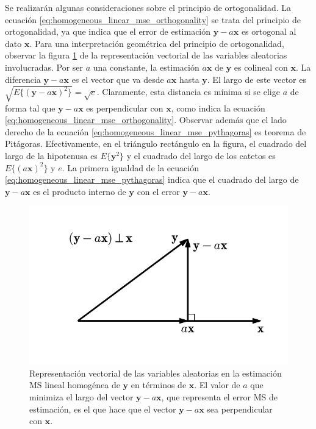 \documentclass[a4paper]{report}
\newcommand{\x}{\mathbf{x}}
\newcommand{\y}{\mathbf{y}}
\begin{document}
Se realizarán algunas consideraciones sobre el principio de ortogonalidad. La ecuación \ref{eq:homogeneous_linear_mse_orthogonality} se trata del principio de ortogonalidad, ya que indica que el error de estimación \(\y-a\x\) es ortogonal al dato \(\x\). Para una interpretación geométrica del principio de ortogonalidad, observar la figura \ref{fig:mse_linear_homogeneous} de la representación vectorial de las variables aleatorias involucradas. Por ser \(a\) una constante, la estimación \(a\x\) de \(\y\) es colineal con \(\x\). La diferencia \(\y-a\x\) es el vector que va desde \(a\x\) hasta \(\y\). El largo de este vector es \(\sqrt{E\{(\y-a\x)^2\}}=\sqrt{e}\). Claramente, esta distancia es mínima si se elige \(a\) de forma tal que \(\y-a\x\) es perpendicular con \(\x\), como indica la ecuación \ref{eq:homogeneous_linear_mse_orthogonality}. Observar además que el lado derecho de la ecuación \ref{eq:homogeneous_linear_mse_pythagoras} es teorema de Pitágoras. Efectivamente, en el triángulo rectángulo en la figura, el cuadrado del largo de la hipotenusa es \(E\{\y^2\}\) y el cuadrado del largo de los catetos es \(E\{(a\x)^2\}\) y \(e\). La primera igualdad de la ecuación \ref{eq:homogeneous_linear_mse_pythagoras} indica que el cuadrado del largo de \(\y-a\x\) es el producto interno de \(\y\) con el error \(\y-a\x\).
\begin{figure}[!htb]
  \begin{minipage}[c]{0.52\textwidth}
    \includegraphics[width=\textwidth]{figuras/mse_linear_homogeneous.pdf}
  \end{minipage}\hfill
  \begin{minipage}[c]{0.45\textwidth}
    \caption{
       Representación vectorial de las variables aleatorias en la estimación MS lineal homogénea de \(\y\) en términos de \(\x\). El valor de \(a\) que minimiza el largo del vector \(\y-a\x\), que representa el error MS de estimación, es el que hace que el vector \(\y-a\x\) sea perpendicular con \(\x\).
    }\label{fig:mse_linear_homogeneous}
  \end{minipage}
\end{figure}
\end{document}
